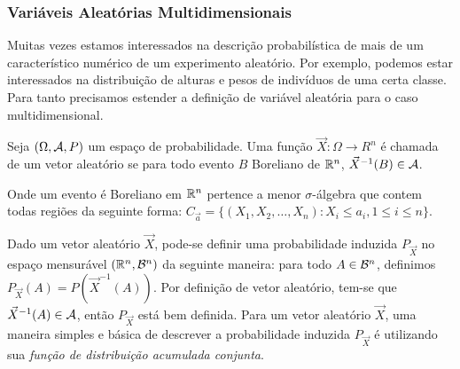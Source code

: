 \begin{frame}
\frametitle{Variáveis Aleatórias Multidimensionais}

Muitas vezes estamos interessados na descrição probabilística de
mais de um característico numérico de um experimento aleatório. Por
exemplo, podemos estar interessados na distribuição de alturas e
pesos de indivíduos de uma certa classe. Para tanto precisamos
estender a definição de variável aleatória para o caso
multidimensional.

\begin{defi}
Seja $(\Omega,{\cal A},P)$ um espaço de probabilidade. Uma função
$\vec{X}:\Omega \rightarrow R^n$ é chamada de um vetor aleatório se
para todo evento $B$ Boreliano de $\mathbb{R}^n$, $\vec{X}^{-1}(B)\in {\cal A}$.
\end{defi}
\bigskip Onde um evento é Boreliano em $\mathbb{R}^n$ pertence a menor
$\sigma$-álgebra que contem todas regiões da seguinte forma:
$C_{\vec{a}}=\{(X_1,X_2,\ldots,X_n):X_i\leq a_i, 1\leq i\leq n\}$.

\bigskip
Dado um vetor aleatório $\vec{X}$, pode-se definir uma probabilidade
induzida $P_{\vec{X}}$ no espaço mensurável $(\mathbb{R}^n,{\cal B}^n)$ da
seguinte maneira: para todo $A\in {\cal B}^n$, definimos
$P_{\vec{X}}(A)=P(\vec{X}^{-1}(A))$. Por definição de vetor
aleatório, tem-se que $\vec{X}^{-1}(A)\in {\cal A}$, então $P_{\vec{X}}$
está bem definida.
\bigskip 
Para um vetor aleatório $\vec{X}$, uma maneira simples e básica de
descrever a probabilidade induzida $P_{\vec{X}}$ é utilizando sua
{\em função de distribuição acumulada conjunta}.

\end{frame}

